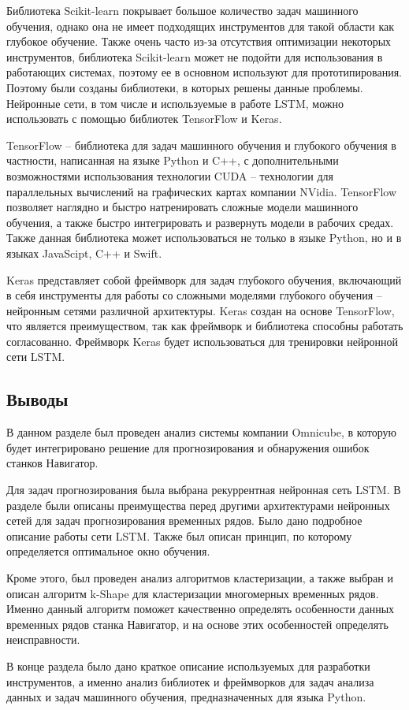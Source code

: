 Библиотека Scikit-learn покрывает большое количество задач машинного обучения,
однако она не имеет подходящих инструментов для такой области как глубокое обучение.
Также очень часто из-за отсутствия оптимизации некоторых инструментов,
библиотека Scikit-learn может не подойти для использования в работающих системах,
поэтому ее в основном используют для прототипирования.
Поэтому были созданы библиотеки, в которых решены данные проблемы.
Нейронные сети, в том числе и используемые в работе LSTM,
можно использовать с помощью библиотек TensorFlow и Keras.

TensorFlow -- библиотека для задач машинного обучения и глубокого обучения в частности,
написанная на языке Python и C++,
с дополнительными возможностями использования технологии CUDA
-- технологии для параллельных вычислений на графических картах компании NVidia.
TensorFlow позволяет наглядно и быстро натренировать сложные модели машинного обучения,
а также быстро интегрировать и развернуть модели в рабочих средах.
Также данная библиотека может использоваться не только в языке Python,
но и в языках JavaScipt, C++ и Swift.

Keras представляет собой фреймворк для задач глубокого обучения,
включающий в себя инструменты для работы со сложными моделями глубокого обучения -- нейронным сетями различной архитектуры.
Keras создан на основе TensorFlow, что является преимуществом, так как фреймворк и библиотека способны работать согласованно.
Фреймворк Keras будет использоваться для тренировки нейронной сети LSTM.

\subsection{Выводы}

В данном разделе был проведен анализ системы компании Omnicube, в которую
будет интегрировано решение для прогнозирования и обнаружения ошибок станков Навигатор.

Для задач прогнозирования была выбрана рекуррентная нейронная сеть LSTM.
В разделе были описаны преимущества перед другими архитектурами нейронных сетей
для задач прогнозирования временных рядов.
Было дано подробное описание работы сети LSTM.
Также был описан принцип, по которому определяется оптимальное окно обучения.

Кроме этого, был проведен анализ алгоритмов кластеризации,
а также выбран и описан алгоритм k-Shape для кластеризации многомерных временных рядов.
Именно данный алгоритм поможет качественно определять особенности данных временных рядов станка Навигатор,
и на основе этих особенностей определять неисправности.

В конце раздела было дано краткое описание используемых для разработки инструментов,
а именно анализ библиотек и фреймворков для задач анализа данных и задач машинного обучения,
предназначенных для языка Python.



\clearpage